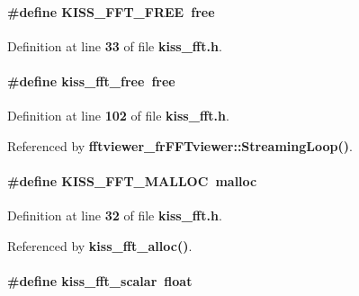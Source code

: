 \paragraph[{K\+I\+S\+S\+\_\+\+F\+F\+T\+\_\+\+F\+R\+EE}]{\setlength{\rightskip}{0pt plus 5cm}\#define K\+I\+S\+S\+\_\+\+F\+F\+T\+\_\+\+F\+R\+EE~free}\label{kiss__fft_8h_a167bff53d1f15bc13289353390b7faae}


Definition at line {\bf 33} of file {\bf kiss\+\_\+fft.\+h}.

\paragraph[{kiss\+\_\+fft\+\_\+free}]{\setlength{\rightskip}{0pt plus 5cm}\#define kiss\+\_\+fft\+\_\+free~free}\label{kiss__fft_8h_a62e86236e852945b8e120d0228377d71}


Definition at line {\bf 102} of file {\bf kiss\+\_\+fft.\+h}.



Referenced by {\bf fftviewer\+\_\+fr\+F\+F\+Tviewer\+::\+Streaming\+Loop()}.

\paragraph[{K\+I\+S\+S\+\_\+\+F\+F\+T\+\_\+\+M\+A\+L\+L\+OC}]{\setlength{\rightskip}{0pt plus 5cm}\#define K\+I\+S\+S\+\_\+\+F\+F\+T\+\_\+\+M\+A\+L\+L\+OC~malloc}\label{kiss__fft_8h_aa6e24524bfa0247ac606c950e43a9a4d}


Definition at line {\bf 32} of file {\bf kiss\+\_\+fft.\+h}.



Referenced by {\bf kiss\+\_\+fft\+\_\+alloc()}.

\paragraph[{kiss\+\_\+fft\+\_\+scalar}]{\setlength{\rightskip}{0pt plus 5cm}\#define kiss\+\_\+fft\+\_\+scalar~float}\label{kiss__fft_8h_a4d9bf2d6a2ce1b061545a16faf77d337}


